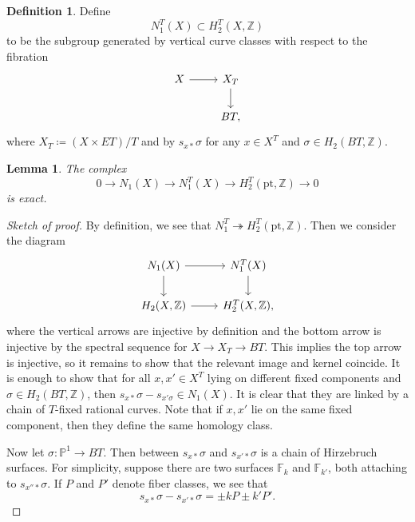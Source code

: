\documentclass{amsart}
\newtheorem{lem}[thm]{Lemma}
\theoremstyle{definition}
\newtheorem{defn}[thm]{Definition}
\theoremstyle{remark}
\theoremstyle{plain}
\theoremstyle{definition}
\theoremstyle{remark}
\newcommand{\Z}{\mathbb{Z}}
\newcommand{\F}{\mathbb{F}}
\renewcommand{\P}{\mathbb{P}}
\newcommand{\mr}[1]{\mathrm{#1}}
\newcommand{\1}{\mathbf{1}}
\newcommand{\2}{\mathbf{2}}
\newcommand{\3}{\mathbf{3}}
\begin{document}
\begin{defn}
    Define
    \[ N_1^T(X) \subset H_2^T(X, \Z) \]
    to be the subgroup generated by vertical curve classes with respect to the fibration
    \begin{equation*}
    \begin{tikzcd}
        X \ar{r} & X_T \ar{d} \\
        & BT,
    \end{tikzcd}
    \end{equation*}
    where \(X_T \coloneqq (X \times ET)/T\) and by \(s_{x*} \sigma\) for any \(x \in X^T\) and \(\sigma \in H_2(BT, \Z)\).
\end{defn}

\begin{lem}
    The complex
    \[ 0 \to N_1(X) \to N_1^T(X) \to H_2^T(\mr{pt}, \Z) \to 0 \]
    is exact.
\end{lem}

\begin{proof}[Sketch of proof]
    By definition, we see that \(N_1^T \twoheadrightarrow H_2^T(\mr{pt}, \Z)\). Then we consider the diagram
    \begin{equation*}
    \begin{tikzcd}
        N_1(X) \ar{r} \ar{d} & N_1^T(X) \ar{d} \\
        H_2(X, \Z) \ar{r} & H_2^T(X, \Z), 
    \end{tikzcd}
    \end{equation*}
    where the vertical arrows are injective by definition and the bottom arrow is injective by the spectral sequence for \(X \to X_T \to BT\). This implies the top arrow is injective, so it remains to show that the relevant image and kernel coincide. It is enough to show that for all \(x, x' \in X^T\) lying on different fixed components and \(\sigma \in H_2(BT, \Z)\), then \(s_{x*} \sigma - s_{x'\sigma} \in N_1(X)\). It is clear that they are linked by a chain of \(T\)-fixed rational curves. Note that if \(x, x'\) lie on the same fixed component, then they define the same homology class.

    Now let \(\sigma \colon \P^1 \to BT\). Then between \(s_{x*}\sigma\) and \(s_{x'*}\sigma\) is a chain of Hirzebruch surfaces. For simplicity, suppose there are two surfaces \(\F_k\) and \(\F_{k'}\), both attaching to \(s_{x''*}\sigma\). If \(P\) and \(P'\) denote fiber classes, we see that
    \[ s_{x*}\sigma - s_{x'*}\sigma = \pm k P \pm k' P'. \]
\end{proof}
\end{document}
